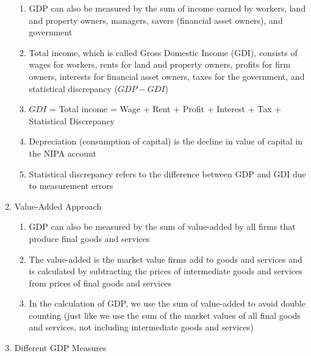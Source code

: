 \documentclass[12pt]{article}
\begin{document}
\begin{enumerate}
        \begin{enumerate}

          \item GDP can also be measured by the sum of income earned by workers, land and property owners, managers, savers (financial asset owners), and government

          \item Total income, which is called Gross Domestic Income (GDI), consists of wages for workers, rents for land and property owners, profits for firm owners, interests for financial asset owners, taxes for the government, and statistical discrepancy ($GDP-GDI$)

          \item $GDI$ = Total income = Wage + Rent + Profit + Interest + Tax + Statistical Discrepancy

          \item Depreciation (consumption of capital) is the decline in value of capital in the NIPA account

          \item Statistical discrepancy refers to the difference between GDP and GDI due to measurement errors

        \end{enumerate}

      \item Value-Added Approach

        \begin{enumerate}

          \item GDP can also be measured by the sum of value-added by all firms that produce final goods and services

          \item The value-added is the market value firms add to goods and services and is calculated by subtracting the prices of intermediate goods and services from prices of final goods and services

          \item In the calculation of GDP, we use the sum of value-added to avoid double counting (just like we use the sum of the market values of all final goods and services, not including intermediate goods and services)

        \end{enumerate}

      \item Different GDP Measures


\end{enumerate}
\end{document}
